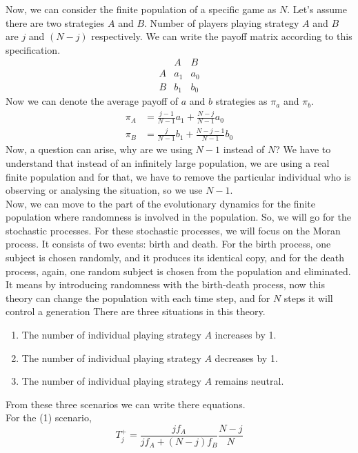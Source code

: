 \documentclass{article}
\begin{document}
Now, we can consider the finite population of a specific game as $N$.
Let's assume there are two strategies $A$ and $B$. Number of players playing strategy $A$ and $B$ are $j$ and $(N-j)$ respectively.
We can write the payoff matrix according to this specification.
\[
\begin{array}{c|cc}
    & A & B \\
    \hline
  A & a_1 & a_0 \\
  B & b_1 & b_0
\end{array}
\]
Now we can denote the average payoff of $a$ and $b$ strategies as $\pi_a$ and $\pi_b$.
\begin{align}
\pi_A&=\frac{j-1}{N-1}a_1 + \frac{N-j}{N-1}a_0 \nonumber\\
\pi_B&=\frac {j}{N-1}b_1 + \frac{N-j-1}{N-1}b_0\label{eq:13}
\end{align}
Now, a question can arise, why are we using $N-1$ instead of $N$? We have to understand that instead of an infinitely large population, we are using a real finite population and for that, we have to remove the particular individual who is observing or analysing the situation, so we use $N-1$.\\
Now, we can move to the part of the evolutionary dynamics for the finite population where randomness is involved in the population.
So, we will go for the stochastic processes.
For these stochastic processes, we will focus on the Moran process. It consists of two events: birth and death. 
For the birth process, one subject is chosen randomly, and it produces its identical copy, and for the death process, again, one random subject is chosen from the population and eliminated. 
It means by introducing randomness with the birth-death process, now this theory can change the population with each time step, and for $N$ steps it will control a generation \cite{Moran1962}
There are three situations in this theory.
\begin{enumerate}
\item The number of individual playing strategy $A$ increases by 1.
\item The number of individual playing strategy $A$ decreases by 1.
\item The number of individual playing strategy $A$ remains neutral.
\end{enumerate}
From these three scenarios we can write there equations.\\
For the (1) scenario,
\begin{equation}
T_j^+=\frac{jf_A}{jf_A+(N-j)f_B}\frac{N-j}{N} \label{eq:14}
\end{equation}
\end{document}
